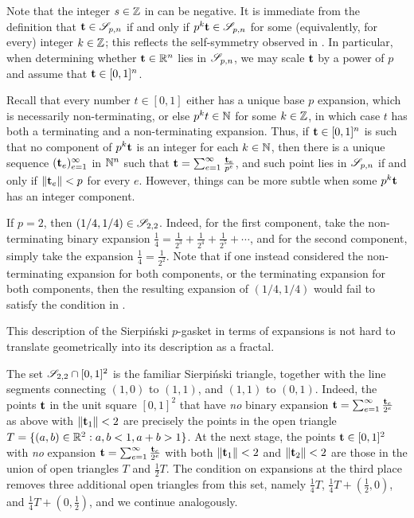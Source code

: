 \documentclass{amsart}
\begin{document}
Note that the integer $s \in \mathbb{Z}$ in  can be negative.
It is immediate from the definition that $\mathbf{t} \in \mathscr{S}_{p,n}$ if and only if $p^k  \mathbf{t} \in \mathscr{S}_{p,n}$ for some (equivalently, for every) integer $k \in \mathbb{Z}$; this reflects the self-symmetry observed in .
In particular, when determining whether $\mathbf{t} \in \mathbb{R}^n$ lies in $\mathscr{S}_{p,n}$, we may scale $\mathbf{t}$ by a power of $p$  and assume that $\mathbf{t} \in [0,1]^n$.

Recall that every number $t \in [0,1]$ either has a unique base $p$ expansion, which is necessarily non-terminating, or else $p^k t \in \mathbb{N}$ for some $k \in \mathbb{Z}$, in which case $t$ has both a terminating and a non-terminating expansion.
Thus, if $\mathbf{t} \in [0,1]^n$ is such that no component of $p^k \mathbf{t}$ is an integer for each $k \in \mathbb{N}$, then there is a unique sequence $( \mathbf{t}_e )_{e=1}^{\infty}$ in $ \mathbb{N}^n$ such that $\mathbf{t} = \sum_{e=1}^{\infty} \frac{\mathbf{t}_e}{p^e}$, and such point lies in ${\mathscr{S}}_{p,n}$ if and only if $\| \mathbf{t}_e \| < p$ for every  $e$.
However, things can be more subtle when some $p^k \mathbf{t}$ has an integer component.

\begin{example}
   If $p=2$, then $(1/4, 1/4) \in \mathscr{S}_{2,2}$.
   Indeed, for the first component, take the non-terminating binary expansion $\frac{1}{4} = \frac{1}{2^3} + \frac{1}{2^4} + \frac{1}{2^5} + \cdots$, and for the second component, simply take the expansion $\frac{1}{4} = \frac{1}{2^2}$.
   Note that if one instead considered the non-terminating expansion for both components, or the terminating expansion for both components, then the resulting expansion of $(1/4, 1/4)$ would fail to satisfy the condition in .
\end{example}

This description of the Sierpi\'nski $p$-gasket in terms of expansions is not hard to translate geometrically into its description as a fractal.

\begin{example}
   \label{sierpinski triangle: E}
   The set $\mathscr{S}_{2,2} \cap [0,1]^2$ is the familiar Sierpi\'nski triangle, together with the line segments connecting $(1,0)$ to $(1,1)$, and $(1,1)$ to $(0,1)$.
   Indeed, the points $\mathbf{t}$ in the unit square $[0,1]^2$ that have \emph{no} binary expansion $\mathbf{t} = \sum_{e=1}^{\infty}\frac{\mathbf{t}_e}{2^e}$ as above with $\| \mathbf{t}_1 \| < 2$ are precisely the points in the open triangle  $T = \{ (a,b) \in \mathbb{R}^2 : a,b < 1, a+b > 1 \}$.
   At the next stage, the points $\mathbf{t} \in [0,1]^2$ with \emph{no} expansion $\mathbf{t} = \sum_{e=1}^{\infty}\frac{\mathbf{t}_e}{2^e}$ with both  $\| \mathbf{t}_1 \| < 2$ and $\| \mathbf{t}_2 \| < 2$ are those in the union of open triangles $T$ and $\frac{1}{2} T$.
   The condition on expansions at the third place removes three additional open triangles from this set, namely $\frac14 T$, $\frac14 T + (\frac12,0)$, and $\frac14 T + (0,\frac12)$, and we continue analogously.
\end{example}
\end{document}
